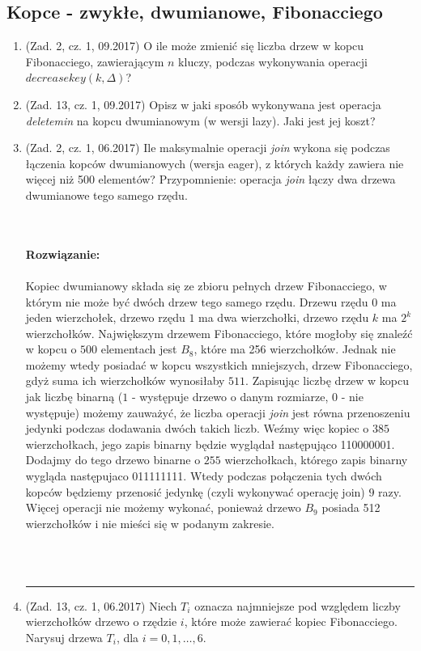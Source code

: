 \documentclass[10pt]{article}%
\newcommand{\beginsolution}{\textbf{\\~\\ \textbf{Rozwiązanie:} \\~\\}}
\newcommand{\finishsolution}{~\\~\\ \noindent\rule{11cm}{0.4pt}}
\begin{document}
\subsection{Kopce - zwykłe, dwumianowe, Fibonacciego}

\begin{enumerate}

\item (Zad. 2, cz. 1, 09.2017) O ile może zmienić się liczba drzew w kopcu Fibonacciego, zawierającym $n$ kluczy, podczas wykonywania operacji $decreasekey(k,\Delta)$?

\item (Zad. 13, cz. 1, 09.2017) Opisz w jaki sposób wykonywana jest operacja \textit{deletemin} na kopcu dwumianowym (w wersji lazy). Jaki jest jej koszt?

\item (Zad. 2, cz. 1, 06.2017) Ile maksymalnie operacji \textit{join} wykona się podczas łączenia kopców dwumianowych (wersja eager), z których każdy zawiera nie więcej niż 500 elementów? Przypomnienie: operacja \textit{join} łączy dwa drzewa dwumianowe tego samego rzędu.

\beginsolution
Kopiec dwumianowy składa się ze zbioru pełnych drzew Fibonacciego, w którym nie może być dwóch drzew tego samego rzędu. Drzewu rzędu $0$ ma jeden wierzchołek, drzewo rzędu $1$ ma dwa wierzchołki, drzewo rzędu $k$ ma $2^k$ wierzchołków. Największym drzewem Fibonacciego, które mogłoby się znaleźć w kopcu o $500$ elementach jest $B_8$, które ma 256 wierzchołków. Jednak nie możemy wtedy posiadać w kopcu wszystkich mniejszych, drzew Fibonacciego, gdyż suma ich wierzchołków wynosiłaby $511$. Zapisując liczbę drzew w kopcu jak liczbę binarną ($1$ - występuje drzewo o danym rozmiarze, $0$ - nie występuje) możemy zauważyć, że liczba operacji \textit{join} jest równa przenoszeniu jedynki podczas dodawania dwóch takich liczb. Weźmy więc kopiec o $385$ wierzchołkach, jego zapis binarny będzie wyglądał następująco 110000001. Dodajmy do tego drzewo binarne o $255$ wierzchołkach, którego zapis binarny wygląda następujaco 011111111. Wtedy podczas połączenia tych dwóch kopców będziemy przenosić jedynkę (czyli wykonywać operację join) $9$ razy. Więcej operacji nie możemy wykonać, ponieważ drzewo $B_9$ posiada 512 wierzchołków i nie mieści się w podanym zakresie.


\finishsolution

\item (Zad. 13, cz. 1, 06.2017) Niech $T_{i}$ oznacza najmniejsze pod względem liczby wierzchołków drzewo o rzędzie $i$, które może zawierać kopiec Fibonacciego. Narysuj drzewa $T_{i}$, dla $i = 0,1,\ldots,6$.


\end{enumerate}
\end{document}
